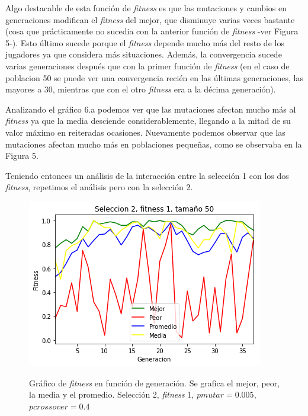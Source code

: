 \documentclass[A4paper,oneside,fleqn,11pt]{article}
\theoremstyle{definition}
\begin{document}
Algo destacable de esta función de \textit{fitness} es que las mutaciones y cambios en generaciones modifican el \textit{fitness} del mejor, que disminuye varias veces bastante (cosa que prácticamente no sucedia con la anterior función de \textit{fitness} -ver Figura 5-). Esto último sucede porque el \textit{fitness} depende mucho más del resto de los jugadores ya que considera más situaciones. Además, la convergencia sucede varias generaciones después que con la primer función de \textit{fitness} (en el caso de poblacion 50 se puede ver una convergencia recién en las últimas generaciones, las mayores a 30, mientras que con el otro \textit{fitness} era a la décima generación). 

Analizando el gráfico 6.a podemos ver que las mutaciones afectan mucho más al \textit{fitness} ya que la media desciende considerablemente, llegando a la mitad de su valor máximo en reiteradas ocasiones. Nuevamente podemos observar que las mutaciones afectan mucho más en poblaciones pequeñas, como se observaba en la Figura 5.

Teniendo entonces un análisis de la interacción entre la selección 1 con los dos \textit{fitness}, repetimos el análisis pero con la selección 2.



\begin{figure}[H]
	\captionsetup[subfigure]{position=b}
	\centering
		{\includegraphics[width=0.3\linewidth]{s2f1t50.png}}
	\caption{Gráfico de \textit{fitness} en función de generación. Se grafica el mejor, peor, la media y el promedio. Selección 2, \textit{fitness} 1, $pmutar=0.005$, $pcrossover=0.4$}
\end{figure}
\end{document}
